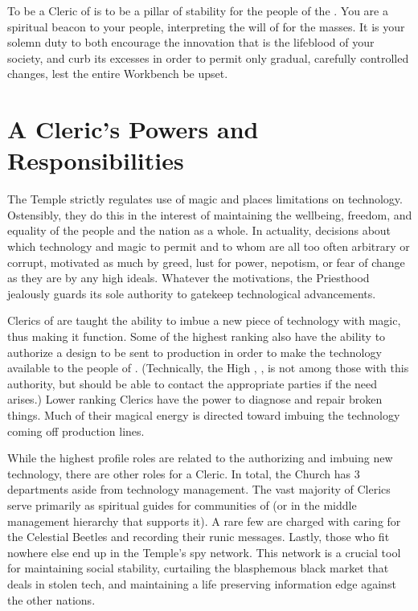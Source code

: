 \documentclass[blue]{GL2020}
\begin{document}
\name{\bFPFCleric{}}

To be a Cleric of \cTechGod{} is to be a pillar of stability for the people of the \pTech{}. You are a spiritual beacon to your people, interpreting the will of \cTechGod{} for the masses. It is your solemn duty to both encourage the innovation that is the lifeblood of your society, and curb its excesses in order to permit only gradual, carefully controlled changes, lest the entire Workbench be upset.

\section*{A Cleric's Powers and Responsibilities}
The Temple strictly regulates use of magic and places limitations on technology. Ostensibly, they do this in the interest of maintaining the wellbeing, freedom, and equality of the people and the nation as a whole. In actuality, decisions about which technology and magic to permit and to whom are all too often arbitrary or corrupt, motivated as much by greed, lust for power, nepotism, or fear of change as they are by any high ideals. Whatever the motivations, the Priesthood jealously guards its sole authority to gatekeep technological advancements.

Clerics of \cTechGod{} are taught the ability to imbue a new piece of technology with magic, thus making it function. Some of the highest ranking also have the ability to authorize a design to be sent to production in order to make the technology available to the people of \pTech{}. (Technically, the High \cAntiChup{\Cleric}, \cAntiChup{}, is not among those with this authority, but \cAntiChup{\they} should be able to contact the appropriate parties if the need arises.) Lower ranking Clerics have the power to diagnose and repair broken things. Much of their magical energy is directed toward imbuing the technology coming off production lines.

While the highest profile roles are related to the authorizing and imbuing new technology, there are other roles for a Cleric. In total, the Church has 3 departments aside from technology management. The vast majority of Clerics serve primarily as spiritual guides for communities of \pTechies{} (or in the middle management hierarchy that supports it). A rare few are charged with caring for the Celestial Beetles and recording their runic messages. Lastly, those who fit nowhere else end up in the Temple’s spy network. This network is a crucial tool for maintaining social stability, curtailing the blasphemous black market that deals in stolen tech, and maintaining a life preserving information edge against the other nations.
\end{document}
